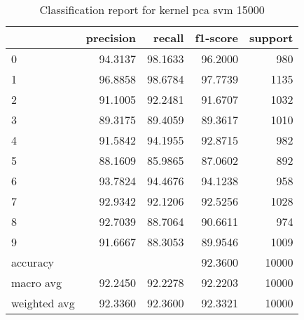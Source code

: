 \begin{table}[htb!]
\centering
\begin{tabular}{lrrrr}
    \toprule
 & precision & recall & f1-score & support \\
\midrule
0 & 94.3137 & 98.1633 & 96.2000 & 980 \\
1 & 96.8858 & 98.6784 & 97.7739 & 1135 \\
2 & 91.1005 & 92.2481 & 91.6707 & 1032 \\
3 & 89.3175 & 89.4059 & 89.3617 & 1010 \\
4 & 91.5842 & 94.1955 & 92.8715 & 982 \\
5 & 88.1609 & 85.9865 & 87.0602 & 892 \\
6 & 93.7824 & 94.4676 & 94.1238 & 958 \\
7 & 92.9342 & 92.1206 & 92.5256 & 1028 \\
8 & 92.7039 & 88.7064 & 90.6611 & 974 \\
9 & 91.6667 & 88.3053 & 89.9546 & 1009 \\
accuracy & & & 92.3600 & 10000\\
macro avg & 92.2450 & 92.2278 & 92.2203 & 10000 \\
weighted avg & 92.3360 & 92.3600 & 92.3321 & 10000 \\
\bottomrule
\end{tabular}
\caption{Classification report for kernel pca svm 15000}
\label{tab:classification-report-kernel_pca_svm_15000}
\end{table}
